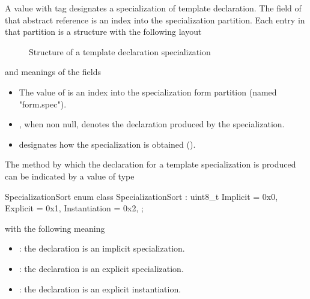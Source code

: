 A  value with tag  designates a specialization of template declaration.
The  field of that abstract reference is an index into the specialization partition.
Each entry in that partition is a structure with the following layout
%
\begin{figure}[H]
	\centering
	\caption{Structure of a template declaration specialization}
	\label{fig:ifc-specialization-declaration}
\end{figure}
%
and meanings of the fields
\begin{itemize}
	\item The value of  is an index into the specialization form partition (named "form.spec").
	\item {}, when non null, denotes the declaration produced by the specialization.
	\item {} designates how the specialization is obtained ().
\end{itemize}


\label{sec:ifc-SpecializationSort}

The method by which the declaration for a template specialization is produced can be indicated by a value of type
%
\begin{typedef}{SpecializationSort}{}
	enum class SpecializationSort : uint8_t {
		Implicit = 0x0,
		Explicit = 0x1,
		Instantiation = 0x2,
	};
\end{typedef}
%
with the following meaning
\begin{itemize}
	\item {}: the declaration is an implicit specialization.
	\item {}: the declaration is an explicit specialization.
	\item {}: the declaration is an explicit instantiation.
\end{itemize}


\subsection{} 
\label{sec:ifc:DeclSort:UnusedSort0}

